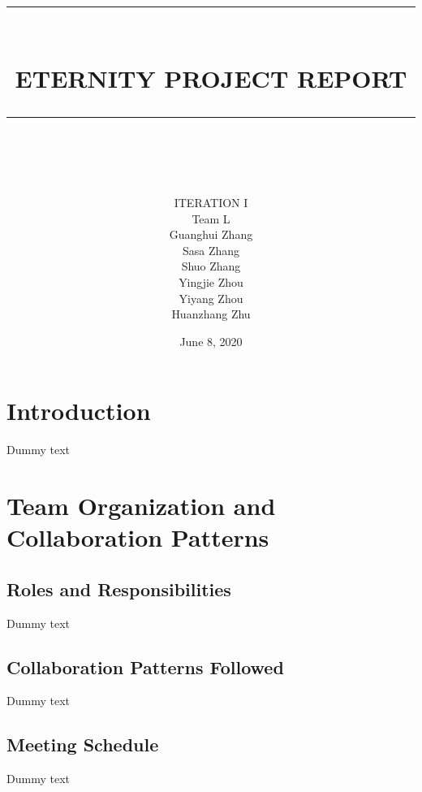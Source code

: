 \documentclass[12pt]{article}
\newcommand{\HRule}[1]{\rule{\linewidth}{#1}}
\begin{document}
\title{ \normalsize \textsc{}
		\\ [2.0cm]
		\HRule{0.5pt} \\
		\LARGE \textbf{\uppercase{Eternity Project Report}}
		\HRule{2pt} \\ [0.5cm]
		\normalsize  \vspace*{5\baselineskip}}
		

\date{June 8, 2020}

\author{
        \vspace{1.5cm}
       \LARGE ITERATION I \\
        \vspace{0.5cm}
        \LARGE Team L\\
        

		Guanghui Zhang\\ 
        Sasa Zhang\\
        Shuo Zhang\\
        Yingjie Zhou\\
        Yiyang Zhou\\
        Huanzhang Zhu\\
 }

\maketitle


\newpage

\tableofcontents
\newpage

\section{Introduction}

Dummy text

\section{Team Organization and Collaboration Patterns}

\subsection{Roles and Responsibilities}
Dummy text


\subsection{Collaboration Patterns Followed}
Dummy text


\subsection{Meeting Schedule}
Dummy text
\end{document}
